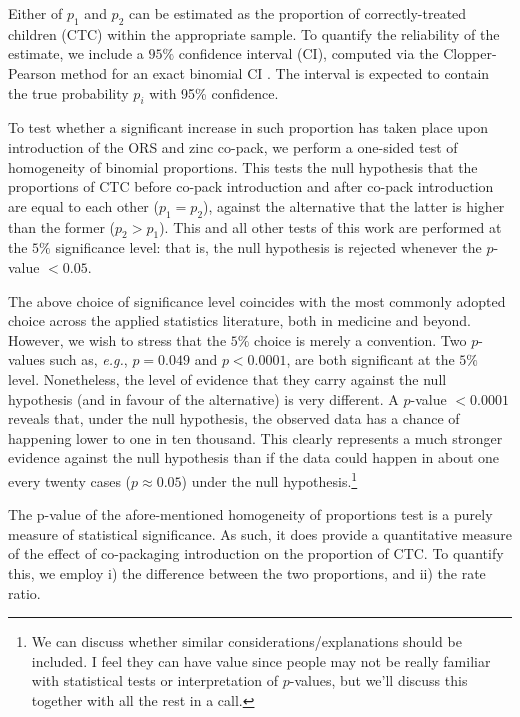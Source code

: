 \documentclass[a4paper, 12pt]{article}
\newcommand{\eg}{\textit{e.g.}}
\begin{document}
Either of $p_1$ and $p_2$ can be estimated as the proportion of correctly-treated children (CTC) within the appropriate sample. To quantify the reliability of the estimate, we include a $95\%$ confidence interval (CI), computed via the Clopper-Pearson method for an exact binomial CI \cite{clopper1934}. The interval is expected to contain the true probability $p_i$ with 95\% confidence.

To test whether a significant increase in such proportion has taken place upon introduction of the ORS and zinc co-pack, we perform a one-sided test of homogeneity of binomial proportions. This tests the null hypothesis that the proportions of CTC before co-pack introduction and after co-pack introduction are equal to each other ($p_1=p_2$), against the alternative that the latter is higher than the former ($p_2>p_1$).
This and all other tests of this work are performed at the $5\%$ significance level: 
that is, the null hypothesis is rejected whenever the $p$-value $<0.05$.

The above choice of significance level coincides with the most commonly adopted choice across the applied statistics literature, both in medicine and beyond. However, we wish to stress that the $5\%$ choice is merely a convention. Two $p$-values such as, \eg, $p=0.049$ and $p<0.0001$, are both significant at the $5\%$ level. 
Nonetheless, the level of evidence that they carry against the null hypothesis (and in favour of the alternative) is very different. A $p$-value $<0.0001$ reveals that, under the null hypothesis, the observed data has a chance of happening lower to one in ten thousand. This clearly represents a much stronger evidence against the null hypothesis than if the data could happen in about one every twenty cases ($p\approx 0.05$) under the null hypothesis.\footnote{We can discuss whether similar considerations/explanations should be included. I feel they can have value since people may not be really familiar with statistical tests or interpretation of $p$-values, but we'll discuss this together with all the rest in a call.}

The p-value of the afore-mentioned homogeneity of proportions test is a purely measure of statistical significance. As such, it does provide a quantitative measure of the effect of co-packaging introduction on the proportion of CTC. To quantify this, we employ i) the difference between the two proportions, and ii) the rate ratio.
\end{document}
